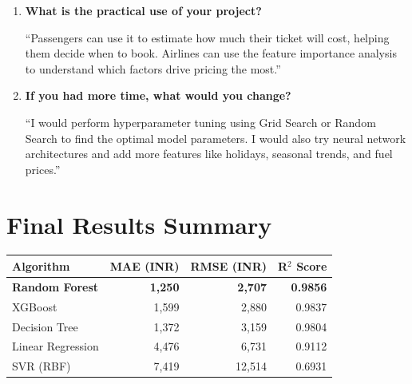 \documentclass[12pt, a4paper]{article}
\begin{document}
\begin{enumerate}[leftmargin=*, label=\textbf{Q\arabic*.}]
\item \textbf{What is the practical use of your project?}
\begin{tipbox}[title=Answer]
    ``Passengers can use it to estimate how much their ticket will cost, helping them decide when to book. Airlines can use the feature importance analysis to understand which factors drive pricing the most.''
\end{tipbox}

\item \textbf{If you had more time, what would you change?}
\begin{tipbox}[title=Answer]
    ``I would perform hyperparameter tuning using Grid Search or Random Search to find the optimal model parameters. I would also try neural network architectures and add more features like holidays, seasonal trends, and fuel prices.''
\end{tipbox}

\end{enumerate}



\part{Final Results Summary}

\begin{center}
\Large
\begin{tabular}{|l|r|r|r|}
    \hline
    \textbf{Algorithm} & \textbf{MAE (INR)} & \textbf{RMSE (INR)} & \textbf{R$^2$ Score} \\
    \hline
    \textbf{Random Forest} & \textbf{1,250} & \textbf{2,707} & \textbf{0.9856} \\
    XGBoost & 1,599 & 2,880 & 0.9837 \\
    Decision Tree & 1,372 & 3,159 & 0.9804 \\
    Linear Regression & 4,476 & 6,731 & 0.9112 \\
    SVR (RBF) & 7,419 & 12,514 & 0.6931 \\
    \hline
\end{tabular}
\end{center}

\vspace{1cm}
\begin{center}
\end{center}
\end{document}
